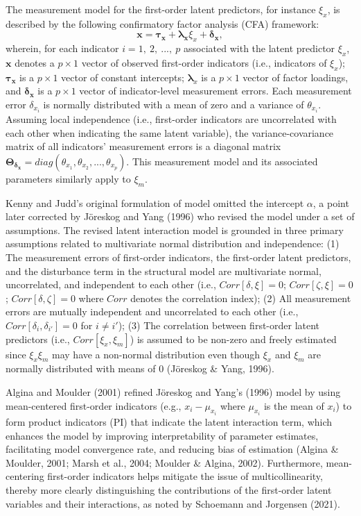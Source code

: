 \documentclass[
  man]{apa6}
\begin{document}
The measurement model for the first-order latent predictors, for instance \(\xi_{x}\), is described by the following confirmatory factor analysis (CFA) framework:
\begin{equation}
\mathbf{x} = \boldsymbol{\tau_{x}} + \boldsymbol{\lambda_{x}}\xi_{x} + \boldsymbol{\delta_{x}},
\end{equation}
wherein, for each indicator \(i = 1, \ 2, \ ..., \ p\) associated with the latent predictor \(\xi_{x}\), \(\mathbf{x}\) denotes a \(p \times 1\) vector of observed first-order indicators (i.e., indicators of \(\xi_{x}\)); \(\boldsymbol{{\tau_{x}}}\) is a \(p \times 1\) vector of constant intercepts; \(\boldsymbol{\lambda}_{x}\) is a \(p \times 1\) vector of factor loadings, and \(\boldsymbol{\delta_{x}}\) is a \(p \times 1\) vector of indicator-level measurement errors. Each measurement error \(\delta_{x_{i}}\) is normally distributed with a mean of zero and a variance of \(\theta_{x_{i}}\). Assuming local independence (i.e., first-order indicators are uncorrelated with each other when indicating the same latent variable), the variance-covariance matrix of all indicators' measurement errors is a diagonal matrix \(\mathbf{\Theta_{\delta_{x}}} = diag(\theta_{x_{1}}, \theta_{x_{2}}, ..., \theta_{x_{p}})\). This measurement model and its associated parameters similarly apply to \(\xi_{m}\).

Kenny and Judd's original formulation of model omitted the intercept \(\alpha\), a point later corrected by Jöreskog and Yang (1996) who revised the model under a set of assumptions. The revised latent interaction model is grounded in three primary assumptions related to multivariate normal distribution and independence: (1) The measurement errors of first-order indicators, the first-order latent predictors, and the disturbance term in the structural model are multivariate normal, uncorrelated, and independent to each other (i.e., \(Corr[\delta, \xi] = 0\); \(Corr[\zeta, \xi] = 0\); \(Corr[\delta, \zeta] = 0\) where \(Corr\) denotes the correlation index); (2) All measurement errors are mutually independent and uncorrelated to each other (i.e., \(Corr[\delta_{i}, \delta_{i'}] = 0\) for \(i \neq i'\)); (3) The correlation between first-order latent predictors (i.e., \(Corr[\xi_{x}, \xi_{m}]\)) is assumed to be non-zero and freely estimated since \(\xi_{x}\xi_{m}\) may have a non-normal distribution even though \(\xi_{x}\) and \(\xi_{m}\) are normally distributed with means of 0 (Jöreskog \& Yang, 1996).

Algina and Moulder (2001) refined Jöreskog and Yang's (1996) model by using mean-centered first-order indicators (e.g., \(x_{i} - \mu_{x_{i}}\) where \(\mu_{x_{i}}\) is the mean of \(x_{i}\)) to form product indicators (PI) that indicate the latent interaction term, which enhances the model by improving interpretability of parameter estimates, facilitating model convergence rate, and reducing bias of estimation (Algina \& Moulder, 2001; Marsh et al., 2004; Moulder \& Algina, 2002). Furthermore, mean-centering first-order indicators helps mitigate the issue of multicollinearity, thereby more clearly distinguishing the contributions of the first-order latent variables and their interactions, as noted by Schoemann and Jorgensen (2021).
\end{document}

